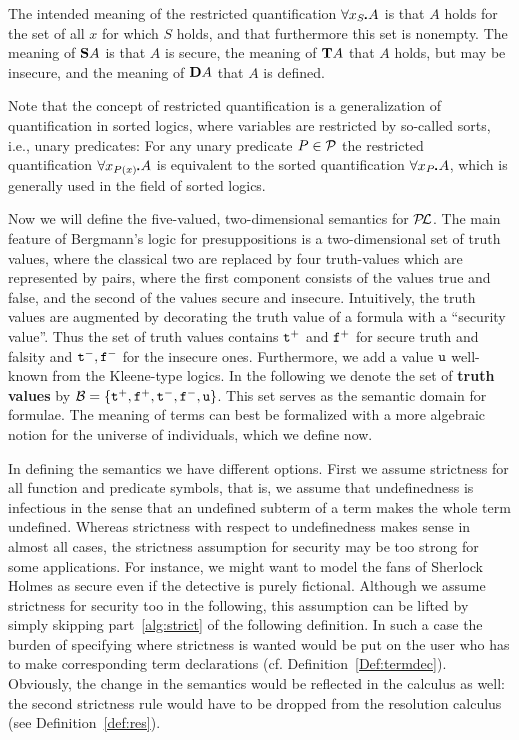 \documentclass{\filespath jancl}
\def\sdot{\rule{.3ex}{.3ex}\hspace{-0.4ex}\;}
\newcommand{\undefined}{{\tt u}}
\newcommand{\twts}{{{\tt t}^+}}
\newcommand{\twfs}{{{\tt f}^+}}
\newcommand{\twti}{{{\tt t}^-}}
\newcommand{\twfi}{{{\tt f}^-}}
\newcommand{\Tval}{{\cal B}}
\def\presuppl{{\cal P\kern-.4ex L}}
\def\Preds{{\cal P}}
\def\tf{{\bf D}}
\def\holds{{\bf T}}
\def\deft{{\bf S}}
\begin{document}
  The intended meaning of the restricted quantification $\forall
  x_S\sdot A$ is that $A$ holds for the set of all $x$ for which $S$
  holds, and that furthermore this set is nonempty. The meaning of
  $\deft A$ is that $A$ is secure, the meaning of $\holds A$ that $A$ holds,
  but may be insecure, and the meaning of $\tf A$ that $A$ is defined.

Note that the concept of restricted quantification is a generalization of
quantification in sorted logics, where variables are restricted by so-called sorts, i.e., unary
predicates: For any unary predicate $P\in\Preds$ the restricted quantification
$\forall x_{P(x)}\sdot A$ is equivalent to the sorted quantification $\forall
x_P\sdot A$, which is generally used in the field of sorted logics.

Now we will define the five-valued, two-dimensional semantics for $\presuppl$.
The main feature of Bergmann's logic for presuppositions is a two-dimensional
set of truth values, where the classical two are replaced by four truth-values
which are represented by pairs, where the first component consists of the
values true and false, and the second of the values secure and insecure.
Intuitively, the truth values are augmented by decorating the truth value of a
formula with a ``security value''. Thus the set of truth values contains
$\twts$ and $\twfs$ for secure truth and falsity and $\twti,\twfi$ for the
insecure ones.  Furthermore, we add a value $\undefined$ well-known from the
Kleene-type logics.  In the following we denote the set of {\bf truth values}
by $\Tval=\{\twts,\twfs,\twti,\twfi,\undefined\}$. 
This set serves as the semantic domain for formulae. The meaning of terms
can best be formalized with a more algebraic notion for the universe of
individuals, which we define now.

In defining the semantics we have different options. First we assume
strictness for all function and predicate symbols, that is, we assume
that undefinedness is infectious in the sense that an undefined
subterm of a term makes the whole term undefined.  Whereas strictness
with respect to undefinedness makes sense in almost all cases, the
strictness assumption for security may be too strong for some
applications. For instance, we might want to model the fans of
Sherlock Holmes as secure even if the detective is purely fictional.
Although we assume strictness for security too in the following, this
assumption can be lifted by simply skipping part~\ref{alg:strict} of
the following definition.  In such a case the burden of specifying
where strictness is wanted would be put on the user who has to make
corresponding term declarations (cf.
Definition~\ref{Def:termdec}). Obviously, the change in the semantics
would be reflected in the calculus as well: the second strictness rule
would have to be dropped from the resolution calculus (see
Definition~\ref{def:res}).
\end{document}

